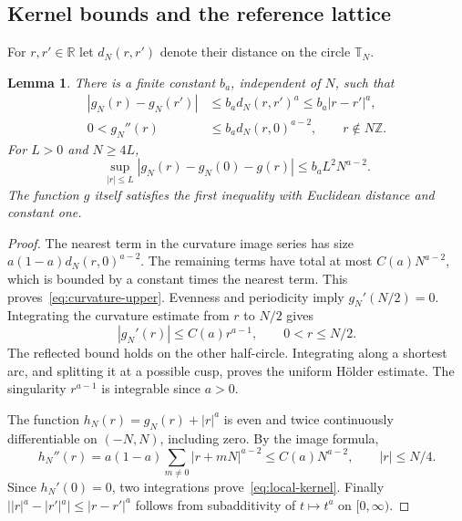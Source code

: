 \documentclass[11pt]{article}
\newtheorem{lemma}[theorem]{Lemma}
\theoremstyle{remark}\newtheorem{remark}[theorem]{Remark}
\newcommand{\R}{\mathbb R}
\newcommand{\Z}{\mathbb Z}
\begin{document}
\subsection{Kernel bounds and the reference lattice}

For $r,r'\in\R$ let $d_N(r,r')$ denote their distance on the
circle $\mathbb T_N$.
\begin{lemma}\label{lem:kernel-bounds}
There is a finite constant $b_a$, independent of $N$, such that
\begin{align}
 |g_N(r)-g_N(r')|&\le b_a d_N(r,r')^a
                         \le b_a|r-r'|^a,\label{eq:holder}\\
 0<g_N''(r)&\le b_a d_N(r,0)^{a-2},
                         \qquad r\notin N\Z.\label{eq:curvature-upper}
\end{align}
For $L>0$ and $N\ge4L$,
\begin{equation}\label{eq:local-kernel}
 \sup_{|r|\le L}|g_N(r)-g_N(0)-g(r)|
                    \le b_aL^2N^{a-2}.
\end{equation}
The function $g$ itself satisfies the first inequality with
Euclidean distance and constant one.
\end{lemma}
\begin{proof}
The nearest term in the curvature image series has size
$a(1-a)d_N(r,0)^{a-2}$. The remaining terms have total at most
$C(a)N^{a-2}$, which is bounded by a constant times the nearest
term. This proves~\eqref{eq:curvature-upper}.
Evenness and periodicity imply $g_N'(N/2)=0$.
Integrating the curvature estimate from $r$ to $N/2$ gives
\[
 |g_N'(r)|\le C(a) r^{a-1},\qquad 0<r\le N/2.
\]
The reflected bound holds on the other half-circle. Integrating
along a shortest arc, and splitting it at a possible cusp, proves
the uniform H\"older estimate. The singularity $r^{a-1}$ is
integrable since $a>0$.

The function $h_N(r)=g_N(r)+|r|^a$ is even and twice continuously
differentiable on $(-N,N)$, including zero. By the image formula,
\[
 h_N''(r)=a(1-a)\sum_{m\ne0}|r+mN|^{a-2}
            \le C(a)N^{a-2},\qquad |r|\le N/4.
\]
Since $h_N'(0)=0$, two integrations prove~\eqref{eq:local-kernel}.
Finally $||r|^a-|r'|^a|\le|r-r'|^a$ follows from subadditivity
of $t\mapsto t^a$ on $[0,\infty)$.
\end{proof}
\end{document}
